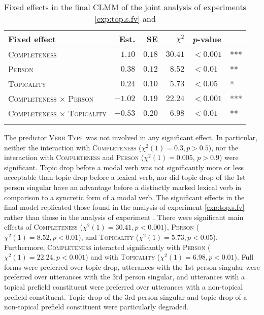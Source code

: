 \begin{table}
\caption{Fixed effects in the final CLMM of the joint analysis of experiments \ref*{exp:top.s.fv} and }
\centering
\begin{tabular}{lrrrll}
\lsptoprule
Fixed effect & Est. & SE & $\chi^2$ & \textit{p}-value &   \\
\midrule
\textsc{Completeness} & $1.10$ & $0.18$ & $30.41$ & $< 0.001$ & ***\\
\textsc{Person} & $0.38$ & $0.12$ &  $8.52$ & $< 0.01$ & **\\
\textsc{Topicality} & $0.24$ & $0.10$ & $5.73$ & $< 0.05$ & *\\
\textsc{Completeness $\times$ Person} & $-1.02$ & $0.19$ & $22.24$ & $< 0.001$ & ***\\
\textsc{Completeness $\times$ Topicality} & $-0.53$ & $0.20$ & $6.98$ & $< 0.01$ & **\\
\lspbottomrule
\end{tabular}
\label{tab:model.exp.top.bv}
\end{table}

\noindent
The predictor \textsc{Verb Type} was not involved in any significant effect.
In particular, neither the interaction with \textsc{Completeness} ($\chi^2(1) = 0.3, p > 0.5$), nor the interaction with \textsc{Completeness} and \textsc{Person} ($\chi^2(1) = 0.005$, $p > 0.9$) were significant.
Topic drop before a modal verb  was not significantly more or less acceptable than topic drop before a lexical verb,  nor did topic drop of the 1st person singular have an advantage before a distinctly marked lexical verb  in comparison to a syncretic form of a modal verb. 
The significant effects in the final model replicated those found in the analysis of experiment \ref*{exp:top.s.fv} rather than those in the analysis of experiment .
There were significant main effects of \textsc{Completeness} ($\chi^2(1) = 30.41, p < 0.001$), \textsc{Person} ($\chi^2(1) = 8.52, p < 0.01$), and \textsc{Topicality} ($\chi^2(1) = 5.73, p < 0.05$).
Furthermore, \textsc{Completeness} interacted significantly with \textsc{Person} ($\chi^2(1) = 22.24, p < 0.001$) and with \textsc{Topicality} ($\chi^2(1) = 6.98, p < 0.01$).
Full forms were preferred over topic drop, utterances with the 1st person singular were preferred over utterances with the 3rd person singular, and utterances with a topical prefield constituent were preferred over utterances with a non-topical prefield constituent.
Topic drop of the 3rd person singular and topic drop of a non-topical prefield constituent were particularly degraded.

